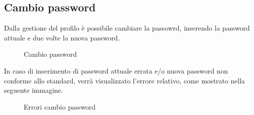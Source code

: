 \subsection{Cambio password}
Dalla gestione del profilo è possibile cambiare la passowrd, inserendo la password attuale e due volte la nuova password. 
\label{Cambio password}
\begin{figure}[H]
	\centering
	\caption{Cambio password}
\end{figure}
In caso di inserimento di password attuale errata e/o nuova password non conforme allo standard, verrà visualizzato l'errore relativo, come mostrato nella seguente immagine.

\label{Errori cambio password}
\begin{figure}[H]
	\centering
	\caption{Errori cambio password}
\end{figure}

